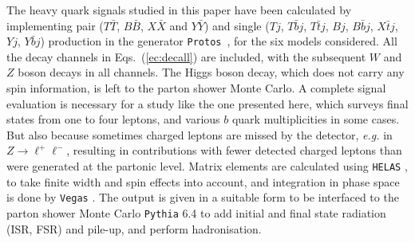 \documentclass[12pt,a4paper]{article}
\newcommand{\TT}{T \bar T}
\newcommand{\BB}{B \bar B}
\newcommand{\XX}{X \bar X}
\newcommand{\YY}{Y \bar Y}
\begin{document}
The heavy quark signals studied in this paper have been calculated by implementing 
pair ($\TT$, $\BB$, $\XX$ and $\YY$) and single ($Tj$, $T \bar b j$, $T \bar t j$, $Bj$, $B \bar b j$, $X \bar t j$, $Yj$, $Y \bar b j$) production in the generator {\tt Protos}~\cite{AguilarSaavedra:2008gt}, for the six models considered. All the decay channels in Eqs.~(\ref{ec:decall}) are included, with the subsequent $W$ and $Z$ boson decays in all channels. The Higgs boson decay, which does not carry any spin information, is left to the parton shower Monte Carlo.
A complete signal evaluation is necessary for a study like the one presented here,  which surveys final states from one to four leptons, and various $b$ quark multiplicities in some cases. But also because sometimes charged leptons are missed by the detector, {\em e.g.} in $Z \to \ell^+ \ell^-$, resulting in contributions with fewer detected charged leptons than were generated at the partonic level.
Matrix elements are calculated using {\tt HELAS} \cite{helas}, to take finite width and spin effects into account, and integration in phase space is done by {\tt Vegas} \cite{vegas}. The output is given in a suitable form to be interfaced to the parton shower Monte Carlo {\tt Pythia} 6.4\cite{Sjostrand:2006za} to add initial and final state radiation (ISR, FSR) and pile-up, and perform hadronisation. 
\end{document}
